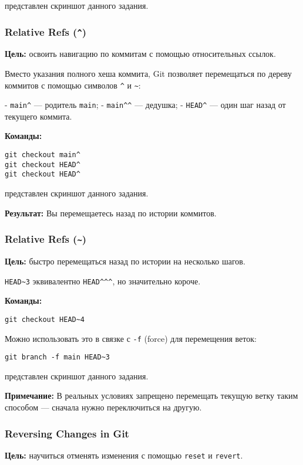 \documentclass[a4paper,12pt]{report}
\begin{document}
 представлен скриншот данного задания.

\subsubsection{Relative Refs (\texttt{\^{}})}
\textbf{Цель:} освоить навигацию по коммитам с помощью относительных ссылок.

Вместо указания полного хеша коммита, Git позволяет перемещаться по дереву коммитов с помощью символов \texttt{\^{}} и \texttt{\~{}}:

- \texttt{main\^} — родитель \texttt{main};
- \texttt{main\^{}}\texttt{\^{}} — дедушка;
- \texttt{HEAD\^} — один шаг назад от текущего коммита.

\textbf{Команды:}
\begin{verbatim}
git checkout main^
git checkout HEAD^
git checkout HEAD^
\end{verbatim}

 представлен скриншот данного задания.

\textbf{Результат:} Вы перемещаетесь назад по истории коммитов.

\subsubsection{Relative Refs (\texttt{\~})}
\textbf{Цель:} быстро перемещаться назад по истории на несколько шагов.

\texttt{HEAD\textasciitilde 3} эквивалентно \texttt{HEAD\^{}\^{}\^{}}, но значительно короче.

\textbf{Команды:}
\begin{verbatim}
git checkout HEAD~4
\end{verbatim}

Можно использовать это в связке с \texttt{-f} (force) для перемещения веток:
\begin{verbatim}
git branch -f main HEAD~3
\end{verbatim}

 представлен скриншот данного задания.

\textbf{Примечание:} В реальных условиях запрещено перемещать текущую ветку таким способом — сначала нужно переключиться на другую.

\subsubsection{Reversing Changes in Git}
\textbf{Цель:} научиться отменять изменения с помощью \texttt{reset} и \texttt{revert}.
\end{document}
